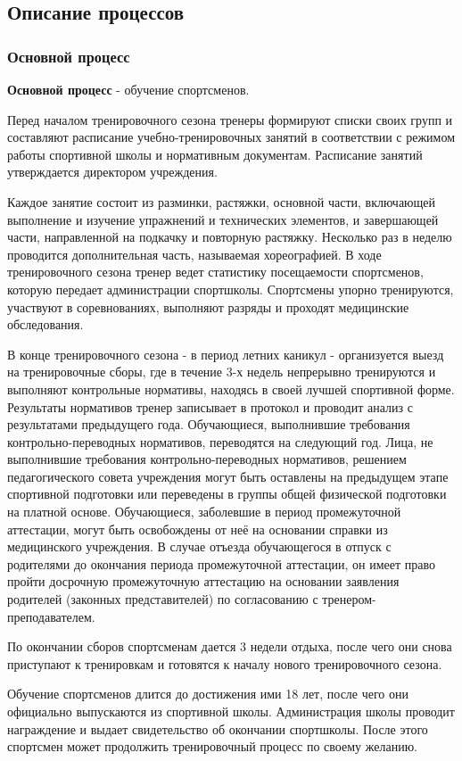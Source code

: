 \documentclass[12pt,a4paper,final]{article} %
\begin{document}
\subsection{Описание процессов}
\subsubsection{Основной процесс}
\par \textbf{Основной процесс} - обучение спортсменов. 
\par Перед началом тренировочного сезона тренеры формируют списки своих групп и составляют расписание учебно-тренировочных занятий в соответствии с режимом работы спортивной школы и нормативным документам. Расписание занятий утверждается директором учреждения. 
\par Каждое занятие состоит из разминки, растяжки, основной части, включающей выполнение и изучение упражнений и технических элементов, и завершающей части, направленной на подкачку и повторную растяжку. Несколько раз в неделю проводится дополнительная часть, называемая хореографией. В ходе тренировочного сезона тренер ведет статистику посещаемости спортсменов, которую передает администрации спортшколы. Спортсмены упорно тренируются, участвуют в соревнованиях, выполняют разряды и проходят медицинские обследования. 
\par В конце тренировочного сезона - в период летних каникул - организуется выезд на тренировочные сборы, где в течение 3-х недель непрерывно тренируются и выполняют контрольные нормативы, находясь в своей лучшей спортивной форме. Результаты нормативов тренер записывает в протокол и проводит анализ с результатами предыдущего года. Обучающиеся, выполнившие требования контрольно-переводных нормативов, переводятся на следующий год. Лица, не выполнившие требования контрольно-переводных нормативов, решением
педагогического совета учреждения могут быть оставлены на предыдущем
этапе спортивной подготовки или переведены в группы общей физической подготовки на платной основе. Обучающиеся, заболевшие в период промежуточной аттестации, могут быть освобождены от неё на основании справки из медицинского учреждения. В случае отъезда обучающегося в отпуск с родителями до окончания периода промежуточной аттестации, он имеет право пройти досрочную промежуточную аттестацию на основании заявления родителей (законных представителей) по согласованию с тренером-преподавателем.  
\par По окончании сборов спортсменам дается 3 недели отдыха, после чего они снова приступают к тренировкам и готовятся к началу нового тренировочного сезона. 
\par Обучение спортсменов длится до достижения ими 18 лет, после чего они официально выпускаются из спортивной школы. Администрация школы проводит награждение и выдает свидетельство об окончании спортшколы. После этого спортсмен может продолжить тренировочный процесс по своему желанию.
\end{document}
